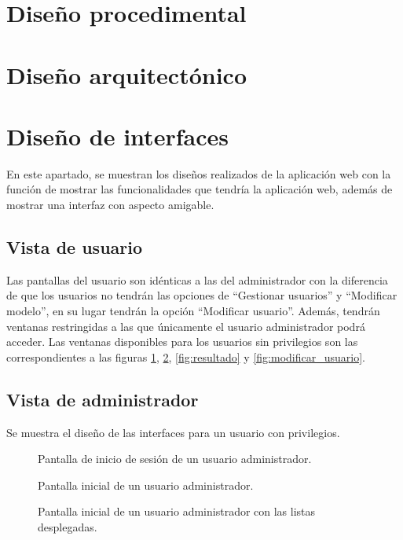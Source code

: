 \section{Diseño procedimental}

\section{Diseño arquitectónico}

\section{Diseño de interfaces}
En este apartado, se muestran los diseños realizados de la aplicación web con la función de mostrar las funcionalidades que tendría la aplicación web, además de mostrar una interfaz con aspecto amigable.

\subsection{Vista de usuario}
Las pantallas del usuario son idénticas a las del administrador con la diferencia de que los usuarios no tendrán las opciones de ``Gestionar usuarios'' y ``Modificar modelo'', en su lugar tendrán la opción ``Modificar usuario''. Además, tendrán ventanas restringidas a las que únicamente el usuario administrador podrá acceder. Las ventanas disponibles para los usuarios sin privilegios son las correspondientes a las figuras \ref{fig:inicio_de_sesion}, \ref{fig:inicio}, \ref{fig:resultado} y \ref{fig:modificar_usuario}.

\subsection{Vista de administrador}
Se muestra el diseño de las interfaces para un usuario con privilegios.
\begin{figure}[h]
	\caption{Pantalla de inicio de sesión de un usuario administrador.}
	\label{fig:inicio_de_sesion}
\end{figure}

\begin{figure}[h]
	\caption{Pantalla inicial de un usuario administrador.}
	\label{fig:inicio}
\end{figure}

\begin{figure}[h]
	\caption{Pantalla inicial de un usuario administrador con las listas desplegadas.}
	\label{fig:inicio_1}
\end{figure}

